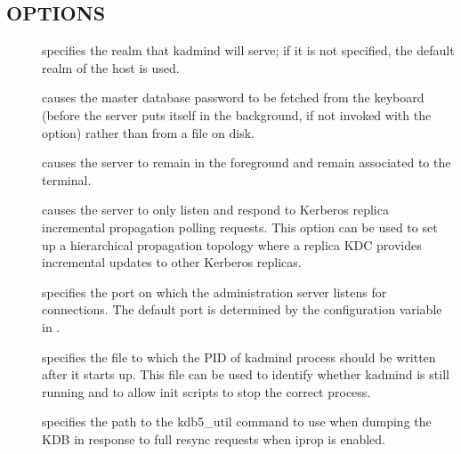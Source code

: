 \documentclass[letterpaper,10pt,english]{sphinxmanual}
\begin{document}
\subsection{OPTIONS}
\label{\detokenize{admin/admin_commands/kadmind:options}}\begin{description}
\item[{ }] \leavevmode
specifies the realm that kadmind will serve; if it is not
specified, the default realm of the host is used.

\item[{}] \leavevmode
causes the master database password to be fetched from the
keyboard (before the server puts itself in the background, if not
invoked with the  option) rather than from a file on
disk.

\item[{}] \leavevmode
causes the server to remain in the foreground and remain
associated to the terminal.

\item[{}] \leavevmode
causes the server to only listen and respond to Kerberos replica
incremental propagation polling requests.  This option can be used
to set up a hierarchical propagation topology where a replica KDC
provides incremental updates to other Kerberos replicas.

\item[{ }] \leavevmode
specifies the port on which the administration server listens for
connections.  The default port is determined by the
 configuration variable in {\hyperref[\detokenize{admin/conf_files/kdc_conf:kdc-conf-5}]{}}.

\item[{ }] \leavevmode
specifies the file to which the PID of kadmind process should be
written after it starts up.  This file can be used to identify
whether kadmind is still running and to allow init scripts to stop
the correct process.

\item[{ }] \leavevmode
specifies the path to the kdb5\_util command to use when dumping the
KDB in response to full resync requests when iprop is enabled.


\end{description}
\end{document}
